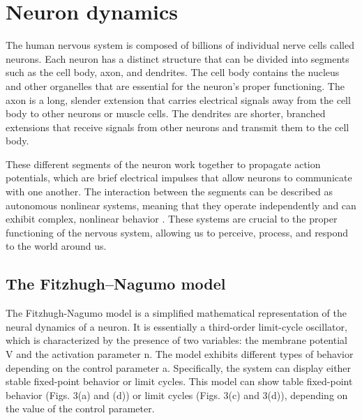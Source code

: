 \documentclass[12pt,a4paper]{report}
\begin{document}
    
\section{Neuron dynamics}
The human nervous system is composed of billions of individual nerve cells called neurons. Each neuron has a distinct structure that can be divided into segments such as the cell body, axon, and dendrites. The cell body contains the nucleus and other organelles that are essential for the neuron's proper functioning. The axon is a long, slender extension that carries electrical signals away from the cell body to other neurons or muscle cells. The dendrites are shorter, branched extensions that receive signals from other neurons and transmit them to the cell body. 
    
These different segments of the neuron work together to propagate action potentials, which are brief electrical impulses that allow neurons to communicate with one another. The interaction between the segments can be described as autonomous nonlinear systems, meaning that they operate independently and can exhibit complex, nonlinear behavior \cite{ref7}. These systems are crucial to the proper functioning of the nervous system, allowing us to perceive, process, and respond to the world around us.
\subsection{The Fitzhugh–Nagumo model}
The Fitzhugh-Nagumo model is a simplified mathematical representation of the neural dynamics of a neuron. It is essentially a third-order limit-cycle oscillator, which is characterized by the presence of two variables: the membrane potential V and the activation parameter n. The model exhibits different types of behavior depending on the control parameter a. Specifically, the system can display either stable fixed-point behavior or limit cycles. This model can show table fixed-point behavior (Figs. 3(a) and (d)) or limit cycles (Figs. 3(c) and 3(d)), depending on the value of the control parameter. 
    
\end{document}
